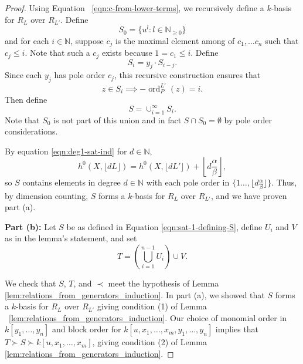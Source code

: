 \documentclass{amsart}
\theoremstyle{plain}
\theoremstyle{definition}
\theoremstyle{remark}
\numberwithin{equation}{section}
\newcommand\BN{{\mathbb N}}
\DeclareMathOperator{\ord}{ord}
\newcommand{\halfcan}{L}
\begin{document}
\begin{proof}
Using Equation ~\ref{eqn:c-from-lower-terms}, we recursively define a $k$-basis for $R_\halfcan$ over $R_{\halfcan'}$. Define 
\[
	S_0 = \{u^l : l \in \BN_{\ge 0}\}
\]
and for each $i \in \BN$, suppose $c_j$ is the maximal element among of $c_1, \ldots c_n$ such that $c_j \le i.$ Note that such a $c_j$ exists because $1=c_1\le i.$ Define
\[
	S_i = y_j \cdot S_{i-j}.
\]
Since each $y_j$ has pole order $c_j$, this recursive construction ensures that 
\[
	z\in S_i \implies -\ord_P^{\halfcan'}(z)=i.
\]
Then define 
\begin{equation}\label{eqn:sat-1-defining-S}
	S = \cup_{i=1}^{\infty} S_i.  
\end{equation}
Note that $S_0$ is not part of this union and in fact $S\cap S_0 = \emptyset$ by pole order considerations.

By equation \ref{eqn:deg1-sat-ind} for $d \in \BN$,
\[
	h^0(X, \lfloor{d\halfcan}\rfloor) = h^0(X, \lfloor d\halfcan'
		\rfloor) + \left\lfloor d\frac{\alpha} {\beta} \right \rfloor,
\] 
so $S$ contains elements in degree $d \in \BN$ with each pole order in $\{1 \ldots, \lfloor d\frac{\alpha}{\beta}\rfloor\}$.  Thus, by dimension counting, $S$ forms a $k$-basis for $R_\halfcan$ over $R_{\halfcan'}$, and we have proven part (a).

{\bf Part (b):}
Let $S$ be as defined in Equation \ref{eqn:sat-1-defining-S}, define $U_i$ and $V$ as in the lemma's statement, and set
\[
	T = \left(\bigcup_{i=1}^{n-1} U_i \right) \cup V.
\]

We check that $S$, $T$, and $\prec$ meet the hypothesis of Lemma \ref{lem:relations_from_generators_induction}.  In part (a), we showed that $S$ forms a $k$-basis for $R_\halfcan$ over $R_{\halfcan'}$ giving condition (1) of Lemma ~\ref{lem:relations_from_generators_induction}.  Our choice of monomial order in $k[y_1, \ldots, y_n]$ and block order for $k[u, x_1, \ldots, x_m, y_1, \ldots, y_n]$ implies that $T\succ S\succ k[u, x_1, \ldots, x_m]$, giving condition (2) of Lemma \ref{lem:relations_from_generators_induction}.  


\end{proof}
\end{document}
